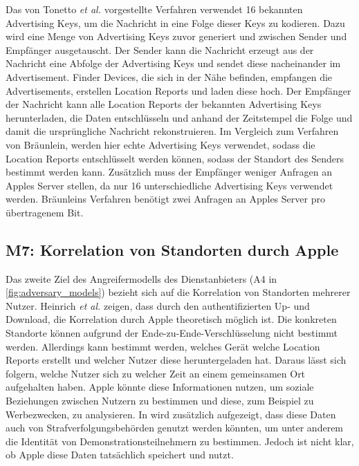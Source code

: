 Das von Tonetto \textit{et al.} \cite{Tonetto_FindMy} vorgestellte Verfahren verwendet 16 bekannten Advertising Keys, um die Nachricht in eine Folge dieser Keys zu kodieren.
Dazu wird eine Menge von Advertising Keys zuvor generiert und zwischen Sender und Empfänger ausgetauscht.
Der Sender kann die Nachricht erzeugt aus der Nachricht eine Abfolge der Advertising Keys und sendet diese nacheinander im Advertisement.
Finder Devices, die sich in der Nähe befinden, empfangen die Advertisements, erstellen Location Reports und laden diese hoch.
Der Empfänger der Nachricht kann alle Location Reports der bekannten Advertising Keys herunterladen, die Daten entschlüsseln und anhand der Zeitstempel die Folge und damit die ursprüngliche Nachricht rekonstruieren.
Im Vergleich zum Verfahren von Bräunlein, werden hier echte Advertising Keys verwendet, sodass die Location Reports entschlüsselt werden können, sodass der Standort des Senders bestimmt werden kann.
Zusätzlich muss der Empfänger weniger Anfragen an Apples Server stellen, da nur 16 unterschiedliche Advertising Keys verwendet werden.
Bräunleins Verfahren benötigt zwei Anfragen an Apples Server pro übertragenem Bit.


\subsection{M7: Korrelation von Standorten durch Apple}
\label{missbrauch:7}

Das zweite Ziel des Angreifermodells des Dienstanbieters (A4 in \autoref{fig:adversary_models}) bezieht sich auf die Korrelation von Standorten mehrerer Nutzer.
Heinrich \textit{et al.} \cite{Heinrich_FindMy} zeigen, dass durch den authentifizierten Up- und Download, die Korrelation durch Apple theoretisch möglich ist.
Die konkreten Standorte können aufgrund der Ende-zu-Ende-Verschlüsselung nicht bestimmt werden.
Allerdings kann bestimmt werden, welches Gerät welche Location Reports erstellt und welcher Nutzer diese heruntergeladen hat.
Daraus lässt sich folgern, welche Nutzer sich zu welcher Zeit an einem gemeinsamen Ort aufgehalten haben.
Apple könnte diese Informationen nutzen, um soziale Beziehungen zwischen Nutzern zu bestimmen und diese, zum Beispiel zu Werbezwecken, zu analysieren.
In \cite{Heinrich_FindMy} wird zusätzlich aufgezeigt, dass diese Daten auch von Strafverfolgungsbehörden genutzt werden könnten, um unter anderem die Identität von Demonstrationsteilnehmern zu bestimmen.
Jedoch ist nicht klar, ob Apple diese Daten tatsächlich speichert und nutzt.